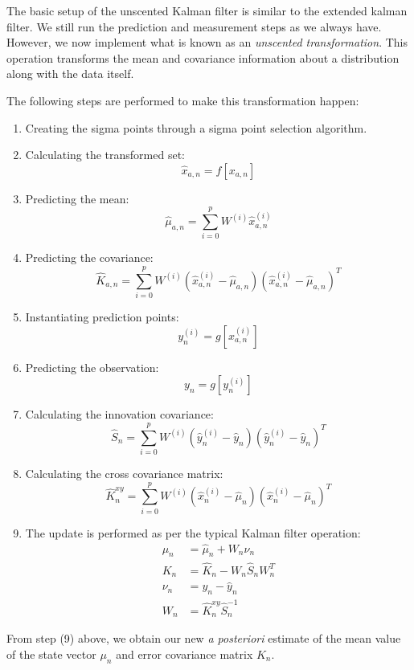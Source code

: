 \documentclass[]{article}
\begin{document}
The basic setup of the unscented Kalman filter is similar to the extended kalman filter. We still run the prediction and measurement steps as we always have. However, we now implement what is known as an \textit{unscented transformation}. This operation transforms the mean and covariance information about a distribution along with the data itself.

The following steps are performed to make this transformation happen:
\begin{enumerate}
    \item Creating the sigma points through a sigma point selection algorithm.
    \item Calculating the transformed set:
        \[\hat{x}_{a,n} = f[x_{a,n}]\]
    \item Predicting the mean:
        \[\hat{\mu}_{a,n} = \sum_{i=0}^{p}{W^{(i)} \hat{x}_{a,n}^{(i)}}\]
    \item Predicting the covariance:
        \[\hat{K}_{a,n} = \sum_{i=0}^{p}{W^{(i)} (\hat{x}_{a,n}^{(i)} - \hat{\mu}_{a,n})(\hat{x}_{a,n}^{(i)} - \hat{\mu}_{a,n})^{T} }\]
    \item Instantiating prediction points:
        \[y_{n}^{(i)} = g[x_{a,n}^{(i)}]\]
    \item Predicting the observation:
        \[y_{n} = g[y_{n}^{(i)}]\]
    \item Calculating the innovation covariance:
        \[\hat{S}_n = \sum_{i=0}^{p}{W^{(i)} (\hat{y}_{n}^{(i)} - \hat{y}_n)(\hat{y}_{n}^{(i)} - \hat{y}_n)^{T} }\]
    \item Calculating the cross covariance matrix:
        \[\hat{K}^{xy}_{n} = \sum_{i=0}^{p}{W^{(i)} (\hat{x}_{n}^{(i)} - \hat{\mu}_n)(\hat{x}_{n}^{(i)} - \hat{\mu}_n)^{T} }\]
    \item The update is performed as per the typical Kalman filter operation:
        \[\begin{split}
        \mu_{n} & = \hat{\mu}_{n} + W_{n}\nu_{n} \\
        K_{n} & = \hat{K}_{n} - W_{n} \hat{S}_{n} W_{n}^{T} \\
        \nu_{n} & = y_{n} - \hat{y}_{n} \\
        W_{n} & = \hat{K}^{xy}_{n} \hat{S}_{n}^{-1}
        \end{split}\]
\end{enumerate}

From step (9) above, we obtain our new \textit{a posteriori} estimate of the mean value of the state vector $\mu_{n}$ and error covariance matrix $K_{n}$.
\end{document}
